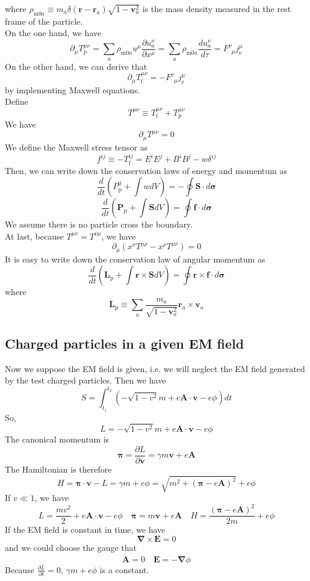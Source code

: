 where $\rho_{\mathrm{m}0a} \equiv m_a \delta(\bm{r}-\bm{r}_a) \sqrt{1-\bm{v}_a^2}$ is the mass density measured in the rest frame of the particle.
\\
On the one hand, we have
\[\partial_{\mu} T_{\mathrm{p}}^{\mu\nu} = \sum_a \rho_{\mathrm{m}0a}u^{\mu} \frac{\partial u_a^{\nu}}{\partial x^{\mu}} = \sum_a \rho_{\mathrm{m}0a} \frac{d u_a^{\nu}}{d \tau} = F^{\nu}_{\phantom{\nu}\mu}j_{\mathrm{e}}^{\mu}\]
On the other hand, we can derive that
\[\partial_{\mu} T_{\mathrm{f}}^{\mu\nu} = - F^{\nu}_{\phantom{\nu}\mu}j_{\mathrm{e}}^{\mu}\]
by implementing Maxwell equations.
\\
Define
\[T^{\mu \nu} \equiv T_{\mathrm{f}}^{\mu\nu} + T_{\mathrm{p}}^{\mu\nu}\]
We have
\[\partial_{\mu} T^{\mu\nu} = 0\]
We define the Maxwell stress tensor as
\[f^{ij} \equiv -T_{\mathrm{f}}^{ij} = E^{i}E^{j} + B^{i}B^{j} - w\delta^{ij}\]
Then, we can write down the conservation laws of energy and momentum as
\[\frac{d}{dt}\left(P_{\mathrm{p}}^0 + \int w dV \right) = -\oint \bm{S}\cdot d\bm{\sigma}\]
\[\frac{d}{dt}\left(\bm{P}_{\mathrm{p}} + \int \bm{S} dV \right) = \oint \bm{f}\cdot d\bm{\sigma}\]
We assume there is no particle cross the boundary.
\\
At last, because $T^{\mu\nu} = T^{\nu\mu}$, we have
\[\partial_{\mu}(x^{\nu}T^{\mu\rho}-x^{\rho}T^{\mu\nu}) = 0\]
It is easy to write down the conservation law of angular momentum as
\[\frac{d}{dt}\left(\bm{L}_{\mathrm{p}} + \int \bm{r} \times \bm{S} dV \right) = \oint \bm{r} \times \bm{f}\cdot d\bm{\sigma}\]
where
\[\bm{L}_{\mathrm{p}} \equiv \sum_a \frac{m_a}{\sqrt{1-\bm{v}_a^2}} \bm{r}_a  \times \bm{v}_a \]

\subsection{Charged particles in a given EM field}
Now we suppose the EM field is given, i.e. we will neglect the EM field generated by the test charged particles. Then we have
\[S = \int_{t_1}^{t_2} (-\sqrt{1-v^2}m + e\bm{A}\cdot\bm{v}-e\phi)dt\]
So,
\[L = -\sqrt{1-v^2}m + e\bm{A}\cdot\bm{v}-e\phi\]
The canonical momentum is
\[\bm{\pi} = \frac{\partial L}{\partial \bm{v}} = \gamma m \bm{v} + e \bm{A}\]
The Hamiltonian is therefore
\[H = \bm{\pi} \cdot \bm{v} - L = \gamma m + e \phi = \sqrt{m^2+(\bm{\pi}-e\bm{A})^2}+e\phi\]
If $v \ll 1$, we have
\[L = \frac{mv^2}{2} + e\bm{A}\cdot\bm{v}-e\phi \quad \bm{\pi} =  m \bm{v} + e \bm{A} \quad H = \frac{(\bm{\pi}-e\bm{A})^2}{2m}+e\phi\]
If the EM field is constant in time, we have
\[\bm{\nabla} \times \bm{E} = 0\]
and we could choose the gauge that
\[\dot{\bm{A}} = 0 \quad \bm{E} = -\bm{\nabla} \phi\]
Because $\frac{\partial L}{\partial t}=0$, $\gamma m + e\phi$ is a constant.

